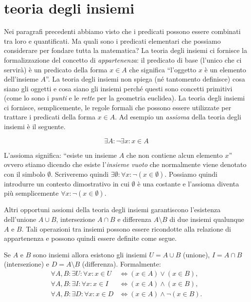 \section{teoria degli insiemi}

Nei paragrafi precedenti abbiamo visto che i predicati possono essere
combinati tra loro e quantificati.
Ma quali sono i predicati elementari che possiamo considerare per fondare 
tutta la matematica?
La teoria degli insiemi ci fornisce la formalizzazione del concetto
di \emph{appartenenza}: il predicato di base (l'unico che ci servirà) è
un predicato della forma $x \in A$ che significa ``l'oggetto $x$ è un elemento
dell'insieme $A$''.
La teoria degli insiemi non spiega (né tantomento definisce)
cosa siano gli oggetti e cosa siano gli insiemi perché questi sono concetti
primitivi (come lo sono i \emph{punti} e le \emph{rette} per la geometria euclidea).
La teoria degli insiemi ci fornisce, semplicemente, le regole formali che
possono essere utilizzate per trattare i predicati della forma $x\in A$.
Ad esempio un \emph{assioma} 
della teoria degli insiemi è il seguente.
\begin{axiom}
\[
  \exists A \colon \lnot \exists x\colon x \in A
\]
\end{axiom}
L'assioma significa: ``esiste un insieme $A$ che non contiene alcun elemento $x$''
ovvero stiamo dicendo che esiste l'\emph{insieme vuoto}%
%
 che normalmente viene
denotato con il simbolo $\emptyset$.
Scriveremo quindi $\exists\emptyset\colon \forall x\colon \lnot(x\in \emptyset)$.
Possiamo quindi introdurre un contesto dimostrativo 
in cui $\emptyset$ è una costante e l'assioma diventa più
semplicemente $\forall x\colon \lnot (x\in \emptyset)$.

Altri opportuni assiomi della teoria degli insiemi garantiscono l'esistenza
dell'unione $A\cup B$, intersezione $A\cap B$ e differenza $A\setminus B$
di due insiemi qualunque $A$ e $B$. Tali operazioni
tra insiemi possono essere ricondotte alla relazione di appartenenza
e possono quindi essere definite come segue.

\begin{axiom}
Se $A$ e $B$ sono insiemi allora esistono gli insiemi  
$U=A\cup B$ (unione), $I=A\cap B$ (intersezione) e 
$D=A\setminus B$ (differenza).
%
%
%
%
Formalmente:
\begin{align*}
    \forall A,B\colon \exists U\colon \forall x\colon x\in U &\iff (x\in A) \lor (x\in B),\\
    \forall A,B\colon \exists I\colon \forall x\colon x\in I &\iff (x\in A) \land (x\in B),\\
    \forall A,B\colon \exists D\colon \forall x\colon x\in D &\iff (x\in A) \land \lnot (x \in B).
\end{align*}
\end{axiom}

